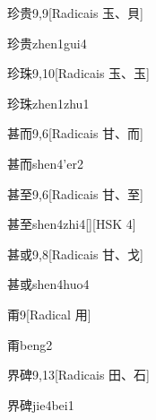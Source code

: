 \begin{entry}{珍贵}{9,9}[Radicais ⽟、⾙]
  \begin{phonetics}{珍贵}{zhen1gui4}
  \end{phonetics}
\end{entry}

\begin{entry}{珍珠}{9,10}[Radicais ⽟、⽟]
  \begin{phonetics}{珍珠}{zhen1zhu1}
  \end{phonetics}
\end{entry}

\begin{entry}{甚而}{9,6}[Radicais ⽢、⽽]
  \begin{phonetics}{甚而}{shen4'er2}
  \end{phonetics}
\end{entry}

\begin{entry}{甚至}{9,6}[Radicais ⽢、⾄]
  \begin{phonetics}{甚至}{shen4zhi4}[][HSK 4]
  \end{phonetics}
\end{entry}

\begin{entry}{甚或}{9,8}[Radicais ⽢、⼽]
  \begin{phonetics}{甚或}{shen4huo4}
  \end{phonetics}
\end{entry}

\begin{entry}{甭}{9}[Radical ⽤]
  \begin{phonetics}{甭}{beng2}
  \end{phonetics}
\end{entry}

\begin{entry}{界碑}{9,13}[Radicais ⽥、⽯]
  \begin{phonetics}{界碑}{jie4bei1}
  \end{phonetics}
\end{entry}

